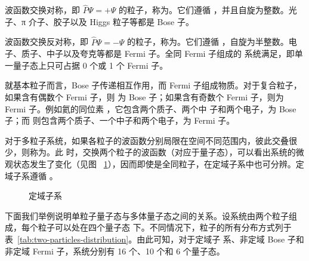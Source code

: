 波函数交换对称，即 $\hat{P}\Psi=+\Psi$ 的粒子，称为。它们遵循%
，并且自旋为整数。光子、π 介子、胶子以及 Higgs 粒子等都是 Bose 子。

波函数交换反对称，即 $\hat{P}\Psi=-\Psi$ 的粒子，称为。它们遵循%
，自旋为半整数。电子、质子、中子以及夸克等都是 Fermi 子。全同 Fermi 子组成的
系统满足，即单一量子态上只可占据 0 个或 1 个 Fermi 子。

就基本粒子而言，Bose 子传递相互作用，而 Fermi 子组成物质。对于复合粒子，如果含有偶数个 Fermi 子，则
为 Bose 子；如果含有奇数个 Fermi 子，则为 Fermi 子。例如氦的同位素 ，它包含两个质子、两个中
子和两个电子，为 Bose 子；而  则包含两个质子、一个中子和两个电子，为 Fermi 子。

对于多粒子系统，如果各粒子的波函数分别局限在空间不同范围内，彼此交叠很少，则称为。此
时，交换两个粒子的波函数（对应于量子态），可以看出系统的微观状态发生了变化（见图~%
\ref{fig:localized-sub-system}），因而即使是全同粒子，在定域子系中也可分辨。定域子系遵循%
。

\begin{figure}[ht]
  \centering
  \FIGPLACEHOLDER
  \caption{定域子系}
  \label{fig:localized-sub-system}
\end{figure}

下面我们举例说明单粒子量子态与多体量子态之间的关系。设系统由两个粒子组成，每个粒子可以处在四个量子态
下。不同情况下，粒子的所有分布方式列于表~\ref{tab:two-particles-distribution}。由此可知，对于定域子
系、非定域 Bose 子和非定域 Fermi 子，系统分别有 16 个、10 个和 6 个量子态。

